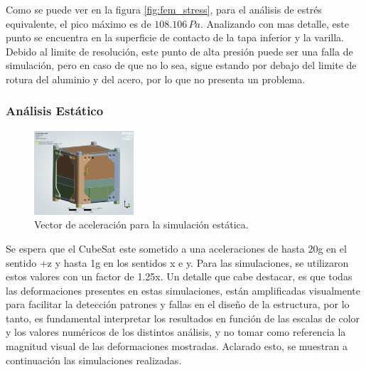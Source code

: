       Como se puede ver en la figura \ref{fig:fem_stress}, para el análisis de estrés equivalente, el pico máximo es de
      $108.106 \, Pa$. Analizando con mas detalle, este punto se encuentra en la superficie de contacto de la tapa
      inferior y la varilla. Debido al limite de resolución, este punto de alta presión puede ser una falla de
      simulación, pero en caso de que no lo sea, sigue estando por debajo del limite de rotura del aluminio y del acero,
      por lo que no presenta un problema.

    \subsubsection{Análisis Estático}
      \begin{figure}
        \vspace{-0.5cm}
        \centering
        \includegraphics[width=0.33\textwidth]{image/fem/ansys_cubesat-static_acceleration.png}
        \caption{Vector de aceleración para la simulación estática.}
        \label{fig:fem_static_acc}
      \end{figure}

      Se espera que el CubeSat este sometido a una aceleraciones de hasta 20g en el sentido +z y hasta 1g en los
      sentidos x e y. Para las simulaciones, se utilizaron estos valores con un factor de 1.25x. Un detalle que cabe
      destacar, es que todas las deformaciones presentes en estas simulaciones, están amplificadas visualmente para
      facilitar la detección patrones y fallas en el diseño de la estructura, por lo tanto, es fundamental interpretar
      los resultados en función de las escalas de color y los valores numéricos de los distintos análisis, y no tomar
      como referencia la magnitud visual de las deformaciones mostradas. Aclarado esto, se muestran a continuación las
      simulaciones realizadas.

